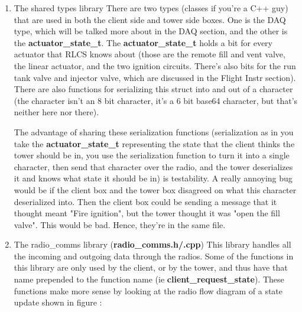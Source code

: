 \documentclass[11pt]{article}
\begin{document}
\begin{enumerate}
\item The shared types library
\label{sec:org362d36f}
There are two types (classes if you're a C++ guy) that are used in both the
client side and tower side boxes. One is the DAQ type, which will be talked more
about in the DAQ section, and the other is the \textbf{actuator\_state\_t}. The
\textbf{actuator\_state\_t} holds a bit for every actuator that RLCS knows about (those
are the remote fill and vent valve, the linear actuator, and the two ignition
circuits. There's also bits for the run tank valve and injector valve, which are
discussed in the Flight Instr section). There are also functions for serializing
this struct into and out of a character (the character isn't an 8 bit character,
it's a 6 bit base64 character, but that's neither here nor there).

The advantage of sharing these serialization functions (serialization as in you
take the \textbf{actuator\_state\_t} representing the state that the client thinks the
tower should be in, you use the serialization function to turn it into a single
character, then send that character over the radio, and the tower deserializes
it and knows what state it should be in) is testability. A really annoying bug
would be if the client box and the tower box disagreed on what this character
deserialized into. Then the client box could be sending a message that it
thought meant "Fire ignition", but the tower thought it was "open the fill
valve". This would be bad. Hence, they're in the same file.

\item The radio\_comms library (\textbf{radio\_comms.h/.cpp})
\label{sec:org2829f55}
This library handles all the incoming and outgoing data through the
radios. Some of the functions in this library are only used by the client, or by
the tower, and thus have that name prepended to the function name (ie
\textbf{client\_request\_state}). These functions make more sense by looking at the radio
flow diagram of a state update shown in figure :


\end{enumerate}
\end{document}
